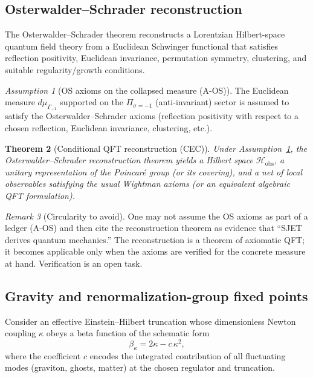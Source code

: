 \documentclass[11pt]{article}
\theoremstyle{plain}
\newtheorem{theorem}{Theorem}[section]
\theoremstyle{definition}
\theoremstyle{remark}
\newtheorem{remark}[theorem]{Remark}
\newtheorem{assumption}[theorem]{Assumption}
\numberwithin{equation}{section}
\begin{document}
\subsection{Osterwalder--Schrader reconstruction}

The Osterwalder--Schrader theorem reconstructs a Lorentzian Hilbert-space quantum field theory from a Euclidean Schwinger functional that satisfies reflection positivity, Euclidean invariance, permutation symmetry, clustering, and suitable regularity/growth conditions.

\begin{assumption}[OS axioms on the collapsed measure (A-OS)]\label{asm:os}
The Euclidean measure $d\mu_{\Gamma_{-1}}$ supported on the $\Pi_{\sigma=-1}$ (anti-invariant) sector is assumed to satisfy the Osterwalder--Schrader axioms (reflection positivity with respect to a chosen reflection, Euclidean invariance, clustering, etc.).
\end{assumption}

\begin{theorem}[Conditional QFT reconstruction (CEC)]\label{thm:os-cond}
Under Assumption~\ref{asm:os}, the Osterwalder--Schrader reconstruction theorem yields a Hilbert space $\mathcal{H}_{\mathrm{obs}}$, a unitary representation of the Poincaré group (or its covering), and a net of local observables satisfying the usual Wightman axioms (or an equivalent algebraic QFT formulation).
\end{theorem}

\begin{remark}[Circularity to avoid]
One may not assume the OS axioms as part of a ledger (A-OS) and then cite the reconstruction theorem as evidence that ``SJET derives quantum mechanics.'' The reconstruction is a theorem of axiomatic QFT; it becomes applicable only when the axioms are verified for the concrete measure at hand. Verification is an open task.
\end{remark}

\subsection{Gravity and renormalization-group fixed points}

Consider an effective Einstein--Hilbert truncation whose dimensionless Newton coupling $\kappa$ obeys a beta function of the schematic form
\[
\beta_\kappa = 2\kappa - c\,\kappa^2,
\]
where the coefficient $c$ encodes the integrated contribution of all fluctuating modes (graviton, ghosts, matter) at the chosen regulator and truncation.
\end{document}
